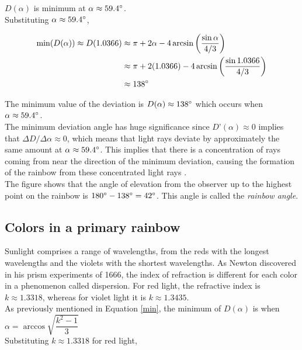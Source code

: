 \documentclass[a4paper,12pt]{article}
\begin{document}
$D(\alpha)$ is minimum at $\alpha \approx 59.4 \degree$.\\

Substituting $\alpha \approx  59.4 \degree$,

\begin{align*}
\min(D(\alpha)) \approx D(1.0366) &\approx \pi + 2\alpha - 4\arcsin \left( \dfrac{\sin \alpha}{4/3} \right)\\
&\approx \pi + 2(1.0366) -  4\arcsin \left( \dfrac{\sin 1.0366}{4/3} \right)\\
&\approx 138 \degree
\end{align*}

The minimum value of the deviation is $D(\alpha) \approx 138 \degree$ which occurs when $\alpha \approx 59.4 \degree$.\\

The minimum deviation angle has huge significance since $D’(\alpha) \approx 0$ implies that $\Delta D/\Delta \alpha \approx 0$, which means that light rays deviate by approximately the same amount at $\alpha \approx 59.4 \degree$. This implies that there is a concentration of rays coming from near the direction of the minimum deviation, causing the formation of the rainbow from these concentrated light rays \cite[219]{stewart21}.\\

The figure shows that the angle of elevation from the observer up to the highest point on the rainbow is $180 \degree - 138 \degree = 42 \degree$. This angle is called the {\itshape rainbow angle}.

\subsection{Colors in a primary rainbow} \label{sec:primarycolor}

Sunlight comprises a range of wavelengths, from the reds with the longest wavelengths and the violets with the shortest wavelengths. As Newton discovered in his prism experiments of
1666, the index of refraction is different for each color in a phenomenon called dispersion.
For red light, the refractive index is $k \approx 1.3318$, whereas for violet light it is $k \approx 1.3435$.\\

As previously mentioned in Equation \eqref{min}, the minimum of $D(\alpha)$ is when $\alpha = \arccos \sqrt{\dfrac{k^2 -1}{3}}$\\

Substituting $k \approx 1.3318$ for red light,
\end{document}
